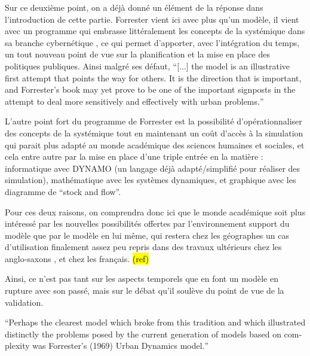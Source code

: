 Sur ce deuxième point, on a déjà donné un élément de la réponse dans l'introduction de cette partie. Forrester vient ici avec plus qu'un modèle, il vient avec un programme \autocite{Forrester1961} qui embrasse littéralement les concepts de la systémique dans sa branche cybernétique \autocite{Berry1970b}, ce qui permet d'apporter, avec l'intégration du temps, un tout nouveau point de vue sur la planification et la mise en place des politiques publiques. Ainsi malgré ses défaut, \foreignquote{english}{[...] the model is an illustrative first attempt that points the way for others. It is the direction that is important, and Forrester's book may yet prove to be one of the important signposts in the attempt to deal more sensitively and effectively with urban problems.} \autocite{Berry1970b}

L'autre point fort du programme de Forrester est la possibilité d'opérationnaliser des concepts de la systémique tout en maintenant un coût d'accès à la simulation qui parait plus adapté au monde académique des sciences humaines et sociales, et cela entre autre par la mise en place d'une triple entrée en la matière : informatique avec DYNAMO (un langage déjà adapté/simplifié pour réaliser des simulation), mathématique avec les systèmes dynamiques, et graphique avec les diagramme de \enquote{stock and flow}.


Pour ces deux raisons, on comprendra donc ici que le monde académique soit plus intéressé par les nouvelles possibilités offertes par l'environnement support du modèle que par le modèle en lui même, qui restera chez les géographes un cas d'utilisation finalement assez peu repris dans des travaux ultérieurs chez les anglo-saxons \autocite[308]{Batty1976}, et chez les français. \hl{(ref)}

Ainsi, ce n'est pas tant sur les aspects temporels que \textcite{Batty2001} en font un modèle en rupture avec son passé, mais sur le débat qu'il soulève du point de vue de la validation.

\foreignquote{english}{Perhaps the clearest model which broke from this tradition and which illustrated distinctly the problems posed by the current generation of models based on complexity was Forrester’s (1969) Urban Dynamics model.}\autocite{Batty2001}

